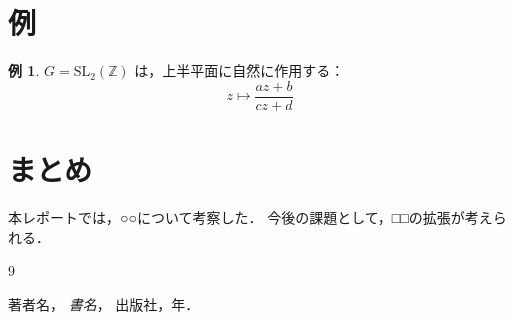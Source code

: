 \documentclass[a4paper,11pt]{ltjsarticle}
\theoremstyle{plain}
\theoremstyle{definition}
\newtheorem{example}[theorem]{例}
\theoremstyle{remark}
\newcommand{\Z}{\mathbb{Z}}
\begin{document}
\section{例}

\begin{example}
$G = \mathrm{SL}_2(\Z)$ は，上半平面に自然に作用する：
\[
  z \mapsto \frac{az+b}{cz+d}
\]
\end{example}

\section{まとめ}

本レポートでは，○○について考察した．
今後の課題として，□□の拡張が考えられる．

\begin{thebibliography}{9}

著者名，
\textit{書名}，
出版社，年．

\end{thebibliography}
\end{document}
